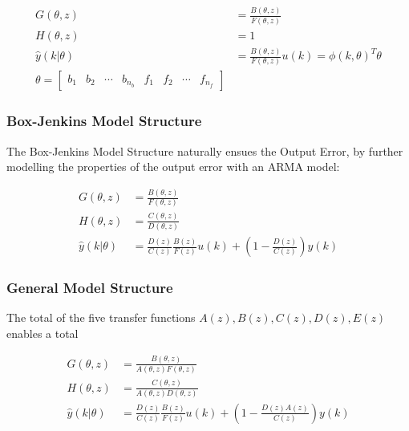 \documentclass[10pt,a4paper]{scrartcl}
\begin{document}
\begin{multicols*}{2}


\begin{align*}
G(\theta,z)&=\frac{B(\theta,z)}{F(\theta,z)}\\
H(\theta,z)&=1\\
\hat{y}(k|\theta)&=\frac{B(\theta,z)}{F(\theta,z)}u(k)=\phi(k,\theta)^T\theta\\
\theta = \begin{bmatrix}
b_1&b_2&\cdots&b_{n_b}&f_1&f_2&\cdots&f_{n_f}
\end{bmatrix}
\end{align*}

\subsubsection{Box-Jenkins Model Structure}

The Box-Jenkins Model Structure naturally ensues the Output Error, by further modelling the properties of the output error with an ARMA model:



\begin{align*}
G(\theta,z)&=\frac{B(\theta,z)}{F(\theta,z)}\\
H(\theta,z)&=\frac{C(\theta,z)}{D(\theta,z)}\\
\hat{y}(k|\theta)&=\frac{D(z)}{C(z)}\frac{B(z)}{F(z)}u(k)+\left(1-\frac{D(z)}{C(z)}\right)y(k)
\end{align*}

\subsubsection{General Model Structure}

The total of the five transfer functions $A(z), B(z),C(z),D(z),E(z)$ enables a total  


\newcommand{\tz}{(\theta,z)}
\begin{align*}
G(\theta,z)&=\frac{B\tz}{A\tz F\tz}\\
H\tz&=\frac{C\tz}{A\tz D\tz}\\
\hat{y}(k|\theta)&=\frac{D(z)}{C(z)}\frac{B(z)}{F(z)}u(k)+\left(1-\frac{D(z)A(z)}{C(z)}\right)y(k)
\end{align*}


\end{multicols*}
\end{document}

